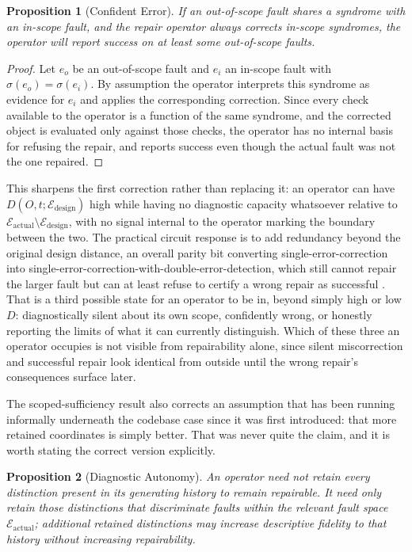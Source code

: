 \documentclass[11pt]{article}
\newtheorem{proposition}{Proposition}[section]
\begin{document}
\begin{proposition}[Confident Error]
If an out-of-scope fault shares a syndrome with an in-scope fault, and the repair operator always corrects in-scope syndromes, the operator will report success on at least some out-of-scope faults.
\end{proposition}

\begin{proof}
Let $e_o$ be an out-of-scope fault and $e_i$ an in-scope fault with $\sigma(e_o) = \sigma(e_i)$. By assumption the operator interprets this syndrome as evidence for $e_i$ and applies the corresponding correction. Since every check available to the operator is a function of the same syndrome, and the corrected object is evaluated only against those checks, the operator has no internal basis for refusing the repair, and reports success even though the actual fault was not the one repaired.
\end{proof}

This sharpens the first correction rather than replacing it: an operator can have $D(O,t;\mathcal{E}_{\text{design}})$ high while having no diagnostic capacity whatsoever relative to $\mathcal{E}_{\text{actual}} \setminus \mathcal{E}_{\text{design}}$, with no signal internal to the operator marking the boundary between the two. The practical circuit response is to add redundancy beyond the original design distance, an overall parity bit converting single-error-correction into single-error-correction-with-double-error-detection, which still cannot repair the larger fault but can at least refuse to certify a wrong repair as successful \cite{circuitsbook}. That is a third possible state for an operator to be in, beyond simply high or low $D$: diagnostically silent about its own scope, confidently wrong, or honestly reporting the limits of what it can currently distinguish. Which of these three an operator occupies is not visible from repairability alone, since silent miscorrection and successful repair look identical from outside until the wrong repair's consequences surface later.

The scoped-sufficiency result also corrects an assumption that has been running informally underneath the codebase case since it was first introduced: that more retained coordinates is simply better. That was never quite the claim, and it is worth stating the correct version explicitly.

\begin{proposition}[Diagnostic Autonomy]
An operator need not retain every distinction present in its generating history to remain repairable. It need only retain those distinctions that discriminate faults within the relevant fault space $\mathcal{E}_{\text{actual}}$; additional retained distinctions may increase descriptive fidelity to that history without increasing repairability.
\end{proposition}
\end{document}
